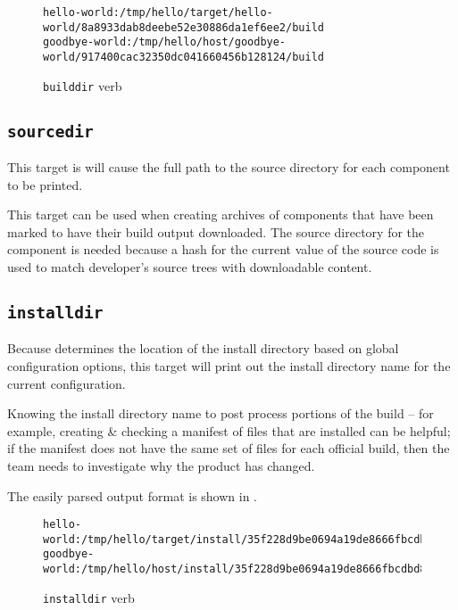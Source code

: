 \begin{figure}[tbh]
\hrulefill
\begin{scriptsize}
\begin{verbatim}
hello-world:/tmp/hello/target/hello-world/8a8933dab8deebe52e30886da1ef6ee2/build
goodbye-world:/tmp/hello/host/goodbye-world/917400cac32350dc041660456b128124/build
\end{verbatim}
\end{scriptsize}
\hrulefill
\caption{\texttt{builddir} verb}\label{usinglmsbw:builddir-verb}
\end{figure}

\subsection{\texttt{sourcedir}}\label{usinglmsbw:sourcedir}

This target is will cause the full path to the source directory for
each component to be printed.

This target can be used when creating archives of components that have
been marked to have their build output downloaded.  The source
directory for the component is needed because a hash for the current
value of the source code is used to match developer's source trees
with downloadable content.

\subsection{\texttt{installdir}}\label{usinglmsbw:installdir}

Because \lmsbw determines the location of the install directory based
on global configuration options, this target will print out the
install directory name for the current configuration.

Knowing the install directory name to post process portions of the
build -- for example, creating \& checking a manifest of files that
are installed can be helpful; if the manifest does not have the same
set of files for each official build, then the \bni team needs to
investigate why the product has changed.

The easily parsed output format is shown in
.

\begin{figure}[tbh]
\hrulefill
\begin{footnotesize}
\begin{verbatim}
hello-world:/tmp/hello/target/install/35f228d9be0694a19de8666fbcdbd80d
goodbye-world:/tmp/hello/host/install/35f228d9be0694a19de8666fbcdbd80d
\end{verbatim}
\end{footnotesize}
\hrulefill
\caption{\texttt{installdir} verb}\label{usinglmsbw:installdir-verb}
\end{figure}

